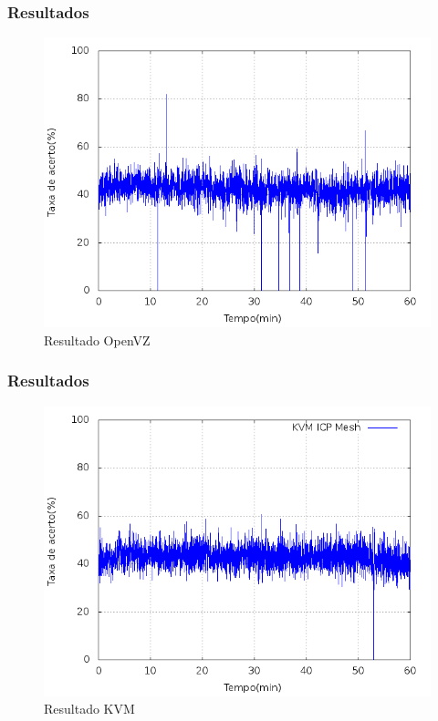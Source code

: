 \documentclass{beamer}
\begin{document}
    \begin{frame}
     \frametitle{Resultados}
      \begin{figure}
      \centering
      \includegraphics[scale=0.4]{imagens/grafico_openvz.png}
      \caption{Resultado OpenVZ}
      \end{figure}
    \end{frame}

    \begin{frame}
     \frametitle{Resultados}
      \begin{figure}
      \centering
      \includegraphics[scale=0.4]{imagens/kvm.png}
      \caption{Resultado KVM}
      \end{figure}
    \end{frame}
\end{document}
